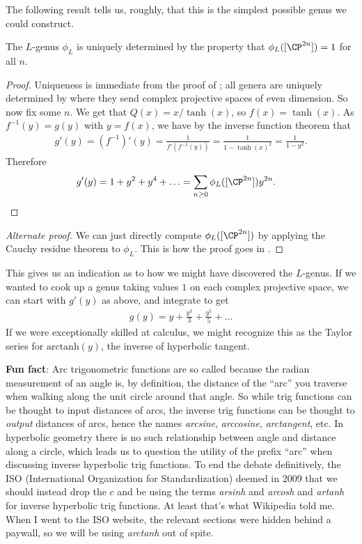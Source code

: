 \documentclass[11pt]{book}
\begin{document}
The following result tells us, roughly, that this is the simplest possible genus we could construct.

\begin{proposition}\label{prop:L-genus-CP2n-to-1} 
The $L$-genus $\phi_L$ is uniquely determined by the property that $\phi_L([\CP^{2n}]) = 1$ for all $n$.
\end{proposition}
\begin{proof} Uniqueness is immediate from the proof of ; all genera are uniquely determined by where they send complex projective spaces of even dimension. So now fix some $n$. We get that $Q(x) = x/\tanh(x)$, so $f(x) = \tanh(x)$. As $f^{-1}(y) = g(y)$ with $y=f(x)$, we have by the inverse function theorem that
\begin{align*}
    g'(y) = (f^{-1})'(y) = \frac{1}{f'(f^{-1}(y))} = \frac{1}{1-\tanh(x)^2} = \frac{1}{1-y^2}.
\end{align*}
Therefore
\begin{align*}
    g'(y) &= 1 + y^2 + y^4 + \ldots  = \sum_{n\ge0} \phi_L([\CP^{2n}]) y^{2n}.
\end{align*}
\end{proof}
\begin{proof}[Alternate proof] We can just directly compute $\phi_L([\CP^{2n}])$ by applying the Cauchy residue theorem to $\phi_L$. This is how the proof goes in \cite[1.5.1]{Hirzebruch}.
\end{proof}

\begin{remark} This gives us an indication as to how we might have discovered the $L$-genus. If we wanted to cook up a genus taking values $1$ on each complex projective space, we can start with $g'(y)$ as above, and integrate to get
\begin{align*}
    g(y) = y + \frac{y^3}{3} + \frac{y^5}{5} + \ldots 
\end{align*}
If we were exceptionally skilled at calculus, we might recognize this as the Taylor series for $\text{arctanh}(y)$, the inverse of hyperbolic tangent.
\end{remark}

\textbf{Fun fact}: Arc trigonometric functions are so called because the radian measurement of an angle is, by definition, the distance of the ``arc'' you traverse when walking along the unit circle around that angle. So while trig functions can be thought to input distances of arcs, the inverse trig functions can be thought to \emph{output} distances of arcs, hence the names \emph{arcsine}, \emph{arccosine}, \emph{arctangent}, etc. In hyperbolic geometry there is no such relationship between angle and distance along a circle, which leads us to question the utility of the prefix ``arc'' when discussing inverse hyperbolic trig functions. To end the debate definitively, the ISO (International Organization for Standardization) deemed in 2009 that we should instead drop the $c$ and be using the terms \emph{arsinh} and \emph{arcosh} and \emph{artanh} for inverse hyperbolic trig functions. At least that's what Wikipedia told me. When I went to the ISO website, the relevant sections were hidden behind a paywall, so we will be using \emph{arctanh} out of spite.
\end{document}
